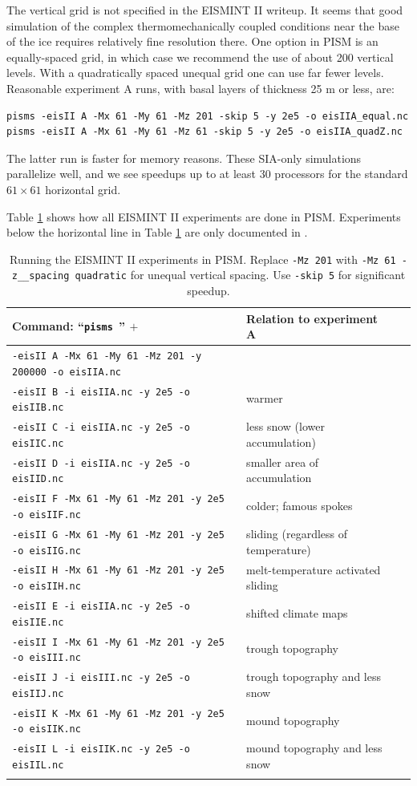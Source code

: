 \documentclass[11pt,final]{amsart}
\renewcommand{\t}[1]{\texttt{#1}}
\newcommand{\und}{\_\!\_}
\begin{document}
The vertical grid is not specified in the EISMINT II writeup.  It seems that good simulation of the complex thermomechanically coupled conditions near the base of the ice requires relatively fine resolution there.  One option in PISM is an equally-spaced grid, in which case we recommend the use of about 200 vertical levels.  With a quadratically spaced unequal grid one can use far fewer levels.  Reasonable experiment A runs, with basal layers of thickness 25 m or less, are:

\begin{verbatim}
pisms -eisII A -Mx 61 -My 61 -Mz 201 -skip 5 -y 2e5 -o eisIIA_equal.nc
pisms -eisII A -Mx 61 -My 61 -Mz 61 -skip 5 -y 2e5 -o eisIIA_quadZ.nc
\end{verbatim}
\noindent The latter run is faster for memory reasons.  These SIA-only simulations parallelize well, and we see speedups up to at least 30 processors for the standard $61\times 61$ horizontal grid.

Table \ref{tab:eisII} shows how all EISMINT II experiments are done in PISM.  Experiments below the horizontal line in Table \ref{tab:eisII} are only documented in \cite{EISIIdescribe}.

\begin{table}[ht]
\caption{Running the EISMINT II experiments in PISM.  Replace \t{-Mz 201} with \t{-Mz 61 -z\und spacing quadratic} for unequal vertical spacing.  Use \t{-skip 5} for significant speedup.}\label{tab:eisII}
\small
\begin{tabular}{@{}llll}\hline
\textbf{Command: ``\t{pisms }'' $+$} & \textbf{Relation to experiment A} \\ \hline
\verb|-eisII A -Mx 61 -My 61 -Mz 201 -y 200000 -o eisIIA.nc| & \\
\verb|-eisII B -i eisIIA.nc -y 2e5 -o eisIIB.nc| & warmer \\
\verb|-eisII C -i eisIIA.nc -y 2e5 -o eisIIC.nc| & less snow (lower accumulation)\\
\verb|-eisII D -i eisIIA.nc -y 2e5 -o eisIID.nc| & smaller area of accumulation \\
\verb|-eisII F -Mx 61 -My 61 -Mz 201 -y 2e5 -o eisIIF.nc| & colder; famous spokes \cite{BBL} \\
\verb|-eisII G -Mx 61 -My 61 -Mz 201 -y 2e5 -o eisIIG.nc| & sliding (regardless of temperature) \\
\verb|-eisII H -Mx 61 -My 61 -Mz 201 -y 2e5 -o eisIIH.nc| & melt-temperature activated sliding \\ \hline
\verb|-eisII E -i eisIIA.nc -y 2e5 -o eisIIE.nc| & shifted climate maps \\
\verb|-eisII I -Mx 61 -My 61 -Mz 201 -y 2e5 -o eisIII.nc| & trough topography \\
\verb|-eisII J -i eisIII.nc -y 2e5 -o eisIIJ.nc| & trough topography and less snow \\
\verb|-eisII K -Mx 61 -My 61 -Mz 201 -y 2e5 -o eisIIK.nc| & mound topography \\
\verb|-eisII L -i eisIIK.nc -y 2e5 -o eisIIL.nc| & mound topography and less snow \\
\hline\normalsize
\end{tabular}\end{table}
\end{document}
